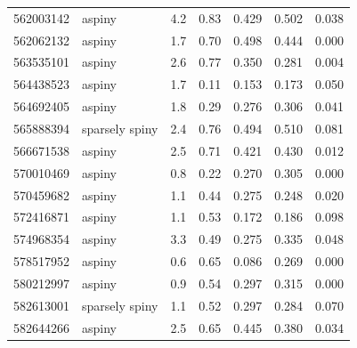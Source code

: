 \begin{tabular}{llrrrrr}
562003142 & aspiny & 4.2 & 0.83 & 0.429 & 0.502 & 0.038\\
562062132 & aspiny & 1.7 & 0.70 & 0.498 & 0.444 & 0.000\\
563535101 & aspiny & 2.6 & 0.77 & 0.350 & 0.281 & 0.004\\
564438523 & aspiny & 1.7 & 0.11 & 0.153 & 0.173 & 0.050\\
564692405 & aspiny & 1.8 & 0.29 & 0.276 & 0.306 & 0.041\\
565888394 & sparsely spiny & 2.4 & 0.76 & 0.494 & 0.510 & 0.081\\
566671538 & aspiny & 2.5 & 0.71 & 0.421 & 0.430 & 0.012\\
570010469 & aspiny & 0.8 & 0.22 & 0.270 & 0.305 & 0.000\\
570459682 & aspiny & 1.1 & 0.44 & 0.275 & 0.248 & 0.020\\
572416871 & aspiny & 1.1 & 0.53 & 0.172 & 0.186 & 0.098\\
574968354 & aspiny & 3.3 & 0.49 & 0.275 & 0.335 & 0.048\\
578517952 & aspiny & 0.6 & 0.65 & 0.086 & 0.269 & 0.000\\
580212997 & aspiny & 0.9 & 0.54 & 0.297 & 0.315 & 0.000\\
582613001 & sparsely spiny & 1.1 & 0.52 & 0.297 & 0.284 & 0.070\\
582644266 & aspiny & 2.5 & 0.65 & 0.445 & 0.380 & 0.034\\
\bottomrule
\end{tabular}
